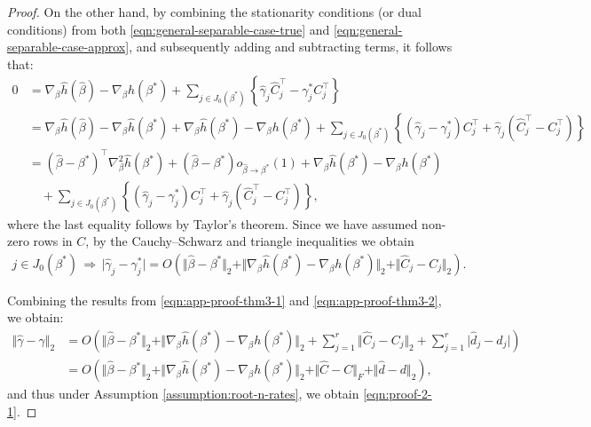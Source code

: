 \begin{proof}
On the other hand, by combining the stationarity conditions (or dual conditions) from both \ref{eqn:general-separable-case-true} and \ref{eqn:general-separable-case-approx}, and subsequently adding and subtracting terms, it follows that:
\begin{align*}
 0 &= \nabla_\beta\widehat{h}(\widehat{\beta}) - \nabla_\beta h(\beta^*) + \sum_{j \in J_0(\beta^*)}\left\{ \widehat{\gamma}_j\widehat{C}_j^\top - \gamma^*_jC_j^\top \right\} \\
 &= \nabla_\beta\widehat{h}(\widehat{\beta}) - \nabla_\beta\widehat{h}(\beta^*) + \nabla_\beta\widehat{h}(\beta^*) - \nabla_\beta h(\beta^*) 
 + \sum_{j \in J_0(\beta^*)}\left\{(\widehat{\gamma}_j-\gamma^*_j){C}_j^\top + \widehat{\gamma}_j(\widehat{C}_j^\top- C_j^\top)\right\} \\
 & = (\widehat{\beta} - \beta^*)^\top \nabla_\beta^2 \widehat{h}(\beta^*) + (\widehat{\beta} - \beta^*) o_{\widehat{\beta} \rightarrow \beta^*}(1) + \nabla_\beta\widehat{h}(\beta^*) - \nabla_\beta h(\beta^*) \\
 & \quad + \sum_{j \in J_0(\beta^*)}\left\{(\widehat{\gamma}_j-\gamma^*_j){C}_j^\top + \widehat{\gamma}_j(\widehat{C}_j^\top- C_j^\top)\right\},
\end{align*}
where the last equality follows by Taylor's theorem. Since we have assumed non-zero rows in $C$, by the Cauchy–Schwarz and triangle inequalities we obtain
\begin{align} \label{eqn:app-proof-thm3-2}
    j \in J_0(\beta^*) \, \Rightarrow \, \vert \widehat{\gamma}_j-\gamma^*_j \vert =O\left( \Vert \widehat{\beta} - \beta^* \Vert_2  + \Vert \nabla_\beta\widehat{h}(\beta^*) - \nabla_\beta h(\beta^*) \Vert_2  + \Vert \widehat{C}_j - C_j \Vert_2 \right). 
\end{align}

Combining the results from \ref{eqn:app-proof-thm3-1} and \ref{eqn:app-proof-thm3-2}, we obtain:
\begin{align*} 
     \Vert \widehat{\gamma}-\gamma \Vert_2 &= O\left( \Vert \widehat{\beta} - \beta^* \Vert_2  + \Vert \nabla_\beta\widehat{h}(\beta^*) - \nabla_\beta h(\beta^*) \Vert_2  + \sum_{j=1}^{r}\Vert \widehat{C}_j - C_j \Vert_2 +  \sum_{j=1}^{r}\vert \widehat{d}_j - d_j \vert \right) \nonumber\\
     &= O\left( \Vert \widehat{\beta} - \beta^* \Vert_2  + \Vert \nabla_\beta\widehat{h}(\beta^*) - \nabla_\beta h(\beta^*) \Vert_2  + \Vert \widehat{C} - C \Vert_F +  \Vert \widehat{d} - d \Vert_2 \right),
\end{align*}
and thus under Assumption \ref{assumption:root-n-rates}, we obtain \eqref{eqn:proof-2-1}.



\end{proof}
